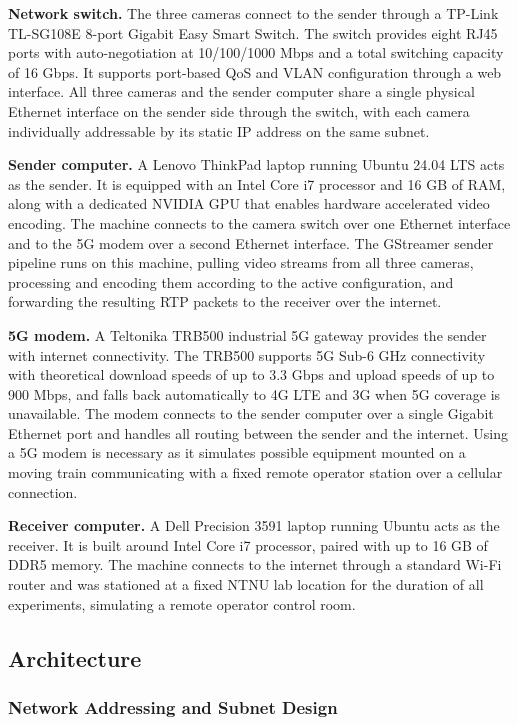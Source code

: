 \textbf{Network switch.} The three cameras connect to the sender through a TP-Link TL-SG108E 8-port Gigabit Easy Smart Switch. The switch provides eight RJ45 ports with auto-negotiation at 10/100/1000 Mbps and a total switching capacity of 16 Gbps. It supports port-based QoS and VLAN configuration through a web interface. All three cameras and the sender computer share a single physical Ethernet interface on the sender side through the switch, with each camera individually addressable by its static IP address on the same subnet.

\textbf{Sender computer.} A Lenovo ThinkPad laptop running Ubuntu 24.04 LTS acts as the sender. It is equipped with an Intel Core i7 processor and 16 GB of RAM, along with a dedicated NVIDIA GPU that enables hardware accelerated video encoding. The machine connects to the camera switch over one Ethernet interface and to the 5G modem over a second Ethernet interface. The GStreamer sender pipeline runs on this machine, pulling video streams from all three cameras, processing and encoding them according to the active configuration, and forwarding the resulting RTP packets to the receiver over the internet.

\textbf{5G modem.} A Teltonika TRB500 industrial 5G gateway provides the sender with internet connectivity. The TRB500 supports 5G Sub-6 GHz connectivity with theoretical download speeds of up to 3.3 Gbps and upload speeds of up to 900 Mbps, and falls back automatically to 4G LTE and 3G when 5G coverage is unavailable. The modem connects to the sender computer over a single Gigabit Ethernet port and handles all routing between the sender and the internet. Using a 5G modem is necessary as it simulates possible equipment mounted on a moving train communicating with a fixed remote operator station over a cellular connection.

\textbf{Receiver computer.} A Dell Precision 3591 laptop running Ubuntu acts as the receiver. It is built around Intel Core i7 processor, paired with up to 16 GB of DDR5 memory. The machine connects to the internet through a standard Wi-Fi router and was stationed at a fixed NTNU lab location for the duration of all experiments, simulating a remote operator control room.

\vspace{5mm}
\subsection{Architecture}

\subsubsection{Network Addressing and Subnet Design}

